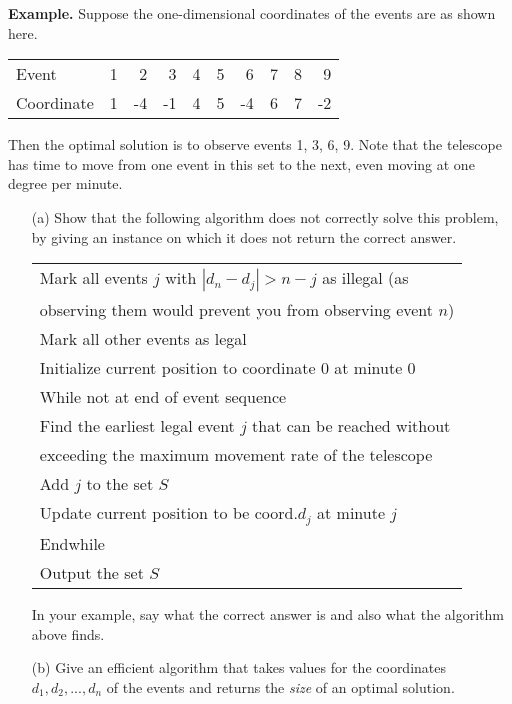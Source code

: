 \documentclass[12pt,letterpaper]{article}
\begin{document}
\textbf{Example.} Suppose the one-dimensional coordinates of the events are as
shown here.
\begin{table}[!h]
\begin{center}
\begin{tabular}{lrrrrrrrrr}
\hline
Event & 1 & 2 & 3 & 4 & 5 & 6 & 7 & 8 & 9\\
Coordinate & 1 & -4 & -1 & 4 & 5 & -4 & 6 & 7 & -2\\
\hline
\end{tabular}
\end{center}
\end{table}

Then the optimal solution is to observe events 1, 3, 6, 9. Note that the
telescope has time to move from one event in this set to the next, even
moving at one degree per minute.
\begin{itemize}
\item[(a)] Show that the following algorithm does not correctly solve this
problem, by giving an instance on which it does not return the correct
answer.
\begin{table}[!h]
\begin{center}
\begin{tabular}{l}
\hline
Mark all events $j$ with $|d_n-d_j| > n-j$ as illegal (as\\
\mbox{\hspace{2em}}observing them would prevent you from observing event $n$)\\
Mark all other events as legal\\
Initialize current position to coordinate 0 at minute 0\\
While not at end of event sequence\\
\mbox{\hspace{2em}}Find the earliest legal event $j$ that can be reached without\\
\mbox{\hspace{4em}}exceeding the maximum movement rate of the telescope\\
\mbox{\hspace{2em}}Add $j$ to the set $S$\\
\mbox{\hspace{2em}}Update current position to be coord.$d_j$ at minute $j$\\
Endwhile\\
Output the set $S$\\
\hline
\end{tabular}
\end{center}
\end{table}

In your example, say what the correct answer is and also what
the algorithm above finds.
\item[(b)] Give an efficient algorithm that takes values for the coordinates
$d_1, d_2, ..., d_n$ of the events and returns the \emph{size} of an optimal solution.
\end{itemize}
\end{document}
